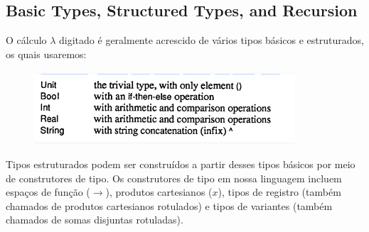 \subsection{Basic Types, Structured Types, and Recursion}
O cálculo $\lambda$ digitado é geralmente acrescido de vários tipos básicos e estruturados, os quais usaremos:

\begin{figure}[h]
    \centering %
    \includegraphics[]{anexos/Screenshot_42.png}
\end{figure}

\par Tipos estruturados podem ser construídos a partir desses tipos básicos por meio de construtores de tipo.
Os construtores de tipo em nossa linguagem incluem espaços de função ($\rightarrow$), produtos cartesianos ($x$), tipos de registro (também chamados de produtos cartesianos rotulados) e tipos de variantes (também chamados de somas disjuntas rotuladas).